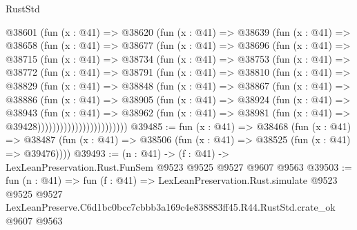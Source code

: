 \begin{lexlean}{RustStd}
\begin{coremodule}
        @38601
          (fun (x : @41) =>
          @38620
            (fun (x : @41) =>
            @38639
              (fun (x : @41) =>
              @38658
                (fun (x : @41) =>
                @38677
                  (fun (x : @41) =>
                  @38696
                    (fun (x : @41) =>
                    @38715
                      (fun (x : @41) =>
                      @38734
                        (fun (x : @41) =>
                        @38753
                          (fun (x : @41) =>
                          @38772
                            (fun (x : @41) =>
                            @38791
                              (fun (x : @41) =>
                              @38810
                                (fun (x : @41) =>
                                @38829
                                  (fun (x : @41) =>
                                  @38848
                                    (fun (x : @41) =>
                                    @38867
                                      (fun (x : @41) =>
                                      @38886
                                        (fun (x : @41) =>
                                        @38905
                                          (fun (x : @41) =>
                                          @38924
                                            (fun (x : @41) =>
                                            @38943
                                              (fun (x : @41) =>
                                              @38962
                                                (fun (x : @41) =>
                                                @38981
                                                  (fun (x : @41) => @39428))))))))))))))))))))))))
@39485 := fun (x : @41) =>
  @38468
    (fun (x : @41) =>
    @38487 (fun (x : @41) => @38506 (fun (x : @41) => @38525 (fun (x : @41) => @39476))))
@39493 := (n : @41) -> (f : @41) -> LexLeanPreservation.Rust.FunSem @9523 @9525 @9527 @9607 @9563
@39503 := fun (n : @41) =>
  fun (f : @41) =>
  LexLeanPreservation.Rust.simulate
    @9523
    @9525
    @9527
    LexLeanPreserve.C6d1bc0bcc7cbbb3a169c4e838883ff45.R44.RustStd.crate_ok
    @9607
    @9563
\end{coremodule}
\end{lexlean}
